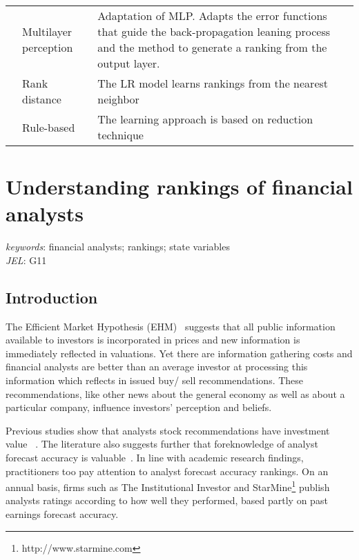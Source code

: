 \documentclass[a4paper,twoside,12pt,openright,notitlepage]{report}\usepackage[]{graphicx}\usepackage[]{color}
\begin{document}
\begin{landscape}
\begin{longtable}{p{6cm}p{4cm}p{6cm}p{4cm}}
& Multilayer perception & Adaptation of MLP. Adapts the error functions that guide the back-propagation leaning process and the method to generate a ranking from the output layer.  &\cite{ribeiro2012} \\
&Rank distance & The LR model learns rankings from the nearest neighbor &\cite{brazdil2003}\\
&Rule-based & The learning approach is based on reduction technique&\cite{gurrieri2012} \\
\bottomrule
\end{longtable}
\end{landscape}
\processdelayedfloats
\cleardoublepage

\chapter{Understanding rankings of financial analysts}
\label{ch3}

\begin{abstract}

\end{abstract}

\textit{keywords}: financial analysts; rankings; state variables \\
\textit{JEL}: G11








\section{Introduction}
\label{ch3-sec:introduction}

The Efficient Market Hypothesis (EHM)~\citep{fama1970ecm} suggests that all public information available to investors is incorporated in prices and new information is immediately reflected in valuations. Yet there are information gathering costs and financial analysts are better than an average investor at processing this information which reflects in issued buy/ sell recommendations. These recommendations, like other news about the general economy as well as about a particular company, influence investors' perception and beliefs.

Previous studies show that analysts stock recommendations have investment value ~\citep{womack1996,barber2001}. The literature also suggests further that foreknowledge of analyst forecast accuracy is valuable~\citep{brown2003,aiguzhinov2015a}. In line with academic research findings, practitioners too pay attention to analyst forecast accuracy rankings. On an annual basis, firms such as The Institutional Investor and StarMine\footnote{http://www.starmine.com} publish analysts ratings according to how well they performed, based partly on past earnings forecast accuracy.
\end{document}
